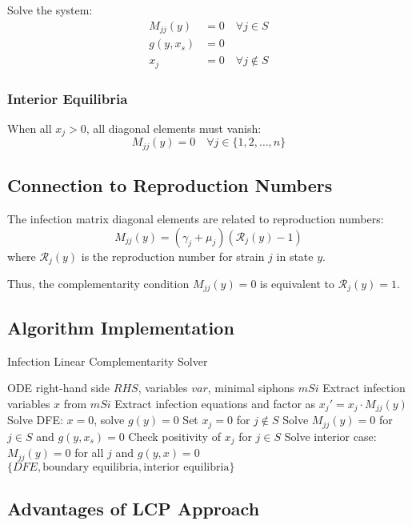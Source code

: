 Solve the system:
$$\begin{aligned}
M_{jj}(y) &= 0 \quad \forall j \in S \\
g(y, x_s) &= 0 \\
x_j &= 0 \quad \forall j \notin S
\end{aligned}$$

\subsubsection{Interior Equilibria}
When all $x_j > 0$, all diagonal elements must vanish:
$$M_{jj}(y) = 0 \quad \forall j \in \{1,2,\ldots,n\}$$

\subsection{Connection to Reproduction Numbers}

The infection matrix diagonal elements are related to reproduction numbers:
$$M_{jj}(y) = (\gamma_j + \mu_j) \left( \mathcal{R}_j(y) - 1 \right)$$
where $\mathcal{R}_j(y)$ is the reproduction number for strain $j$ in state $y$.

Thus, the complementarity condition $M_{jj}(y) = 0$ is equivalent to $\mathcal{R}_j(y) = 1$.

\subsection{Algorithm Implementation}

\begin{algorithm}[H]
\caption{Infection Linear Complementarity Solver}
\begin{algorithmic}[1]
\REQUIRE ODE right-hand side $RHS$, variables $var$, minimal siphons $mSi$
\STATE Extract infection variables $x$ from $mSi$
\STATE Extract infection equations and factor as $x_j' = x_j \cdot M_{jj}(y)$
\STATE Solve DFE: $x = 0$, solve $g(y) = 0$
    \STATE Set $x_j = 0$ for $j \notin S$
    \STATE Solve $M_{jj}(y) = 0$ for $j \in S$ and $g(y,x_s) = 0$
    \STATE Check positivity of $x_j$ for $j \in S$
\ENDFOR
\STATE Solve interior case: $M_{jj}(y) = 0$ for all $j$ and $g(y,x) = 0$
\RETURN $\{DFE, \text{boundary equilibria}, \text{interior equilibria}\}$
\end{algorithmic}
\end{algorithm}

\subsection{Advantages of LCP Approach}

